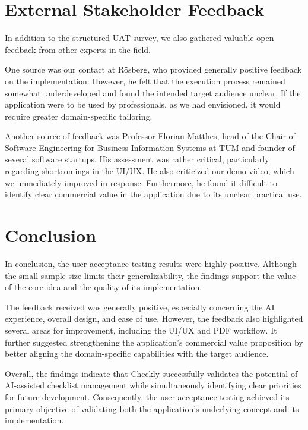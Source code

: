 \documentclass[11pt]{article}
\begin{document}
\section{External Stakeholder Feedback}

In addition to the structured UAT survey, we also gathered valuable open feedback from other experts in the field.

One source was our contact at R\"{o}sberg, who provided generally positive feedback on the implementation. However, he felt that the execution process remained somewhat underdeveloped and found the intended target audience unclear. If the application were to be used by professionals, as we had envisioned, it would require greater domain-specific tailoring.

Another source of feedback was Professor Florian Matthes, head of the Chair of Software Engineering for Business Information Systems at TUM and founder of several software startups. His assessment was rather critical, particularly regarding shortcomings in the UI/UX. He also criticized our demo video, which we immediately improved in response. Furthermore, he found it difficult to identify clear commercial value in the application due to its unclear practical use.

\section{Conclusion}
In conclusion, the user acceptance testing results were highly positive. Although the small sample size limits their generalizability, the findings support the value of the core idea and the quality of its implementation.

The feedback received was generally positive, especially concerning the AI experience, overall design, and ease of use. However, the feedback also highlighted several areas for improvement, including the UI/UX and PDF workflow. It further suggested strengthening the application’s commercial value proposition by better aligning the domain-specific capabilities with the target audience.

Overall, the findings indicate that Checkly successfully validates the potential of AI-assisted checklist management while simultaneously identifying clear priorities for future development. Consequently, the user acceptance testing achieved its primary objective of validating both the application's underlying concept and its implementation.
\end{document}
